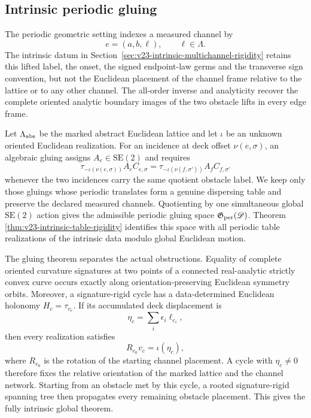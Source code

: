 \subsection{Intrinsic periodic gluing}

The periodic geometric setting indexes a measured channel by
\[
                         e=(a,b,\ell),\qquad \ell\in\Lambda.
\]
The intrinsic datum in
Section~\ref{sec:v23-intrinsic-multichannel-rigidity} retains this lifted label,
the onset, the signed endpoint-law germs and the transverse sign convention,
but not the Euclidean placement of the channel frame relative to the lattice
or to any other channel.  The all-order inverse and analyticity recover the
complete oriented analytic boundary images of the two obstacle lifts in every
edge frame.

Let \(\Lambda_{\rm abs}\) be the marked abstract Euclidean lattice and let
\(\iota\) be an unknown oriented Euclidean realization.  For an incidence at
deck offset \(\nu(e,\sigma)\), an algebraic gluing assigns
\(A_e\in\mathrm{SE}(2)\) and requires
\[
 \tau_{-\iota(\nu(e,\sigma))}A_eC_{e,\sigma}
 =
 \tau_{-\iota(\nu(f,\sigma'))}A_fC_{f,\sigma'}
\]
whenever the two incidences carry the same quotient obstacle label.  We keep
only those gluings whose periodic translates form a genuine dispersing table
and preserve the declared measured channels.  Quotienting by one simultaneous
global \(\mathrm{SE}(2)\) action gives the admissible periodic gluing space
\(\mathfrak G_{\rm per}(\mathscr D)\).  Theorem
\ref{thm:v23-intrinsic-table-rigidity} identifies this space with all periodic
table realizations of the intrinsic data modulo global Euclidean motion.

The gluing theorem separates the actual obstructions.  Equality of complete
oriented curvature signatures at two points of a connected real-analytic
strictly convex curve occurs exactly along orientation-preserving Euclidean
symmetry orbits.  Moreover, a signature-rigid cycle has a data-determined
Euclidean holonomy \(H_c=\tau_{v_c}\).  If its accumulated deck displacement is
\[
                         \eta_c=\sum_i\epsilon_i\ell_{e_i},
\]
then every realization satisfies
\[
                         R_{e_0}v_c=\iota(\eta_c),
\]
where \(R_{e_0}\) is the rotation of the starting channel placement.  A cycle
with \(\eta_c\ne0\) therefore fixes the relative orientation of the marked
lattice and the channel network.  Starting from an obstacle met by this cycle,
a rooted signature-rigid spanning tree then propagates every remaining
obstacle placement.  This gives the fully intrinsic global theorem.

